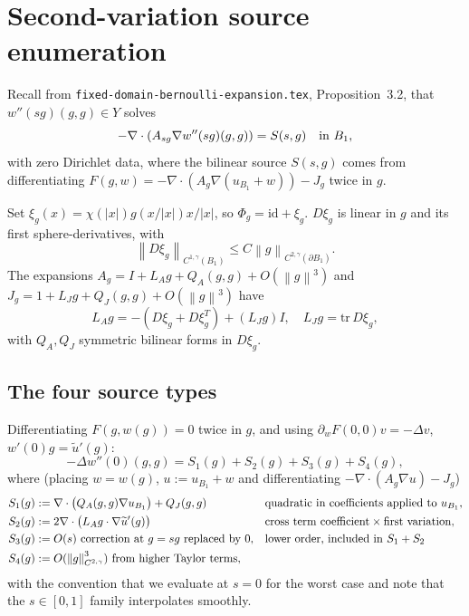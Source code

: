 \documentclass[11pt]{article}
\theoremstyle{definition}
\newcommand{\norm}[1]{\left\|#1\right\|}
\newcommand{\abs}[1]{\left|#1\right|}
\begin{document}
\section{Second-variation source enumeration}\label{sec:sources}

Recall from \texttt{fixed-domain-bernoulli-expansion.tex},
Proposition~3.2, that $w''(sg)(g,g)\in Y$ solves
\[
-\nabla\cdot(A_{sg}\nabla w''(sg)(g,g))=S(s,g)\quad\hbox{in }B_1,
\]
with zero Dirichlet data, where the bilinear source $S(s,g)$ comes from
differentiating $F(g,w)=-\nabla\cdot(A_g\nabla(u_{B_1}+w))-J_g$ twice in $g$.

Set $\xi_g(x)=\chi(\abs x)g(x/\abs x)x/\abs x$, so $\Phi_g=\mathrm{id}+\xi_g$.
$D\xi_g$ is linear in $g$ and its first sphere-derivatives, with
\[
\norm{D\xi_g}_{C^{1,\gamma}(B_1)}\le C\norm{g}_{C^{2,\gamma}(\partial B_1)}.
\]
The expansions $A_g=I+L_Ag+Q_A(g,g)+O(\norm g^3)$ and
$J_g=1+L_Jg+Q_J(g,g)+O(\norm g^3)$ have
\begin{equation}\label{eq:LQ}
L_Ag=-(D\xi_g+D\xi_g^T)+(L_Jg)I,\quad L_Jg=\mathrm{tr}\,D\xi_g,
\end{equation}
with $Q_A,Q_J$ symmetric bilinear forms in $D\xi_g$.

\subsection{The four source types}

Differentiating $F(g,w(g))=0$ twice in $g$, and using
$\partial_w F(0,0)v=-\Delta v$, $w'(0)g=\widetilde u'(g)$:
\[
-\Delta w''(0)(g,g)
=S_1(g)+S_2(g)+S_3(g)+S_4(g),
\]
where (placing $w=w(g)$, $u:=u_{B_1}+w$ and differentiating $-\nabla\cdot(A_g\nabla u)-J_g$)
\begin{align}
S_1(g)&:=\nabla\cdot\bigl(Q_A(g,g)\nabla u_{B_1}\bigr)+Q_J(g,g)
&&\hbox{quadratic in coefficients applied to }u_{B_1},\label{eq:S1}\\
S_2(g)&:=2\nabla\cdot\bigl(L_Ag\cdot\nabla\widetilde u'(g)\bigr)
&&\hbox{cross term coefficient}\times\hbox{first variation},\label{eq:S2}\\
S_3(g)&:=O(s)\hbox{ correction at }g=sg\hbox{ replaced by 0},
&&\hbox{lower order, included in }S_1+S_2\label{eq:S3}\\
S_4(g)&:=O(\norm{g}_{C^{2,\gamma}}^3)\hbox{ from higher Taylor terms},\label{eq:S4}
\end{align}
with the convention that we evaluate at $s=0$ for the worst case and note that
the $s\in[0,1]$ family interpolates smoothly.
\end{document}
